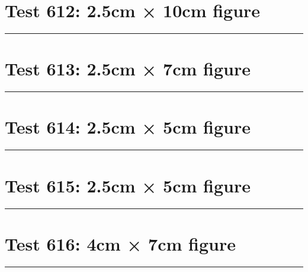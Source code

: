 \documentclass[a4paper,11pt]{article}
\begin{document}
\section*{Test 612: 2.5cm × 10cm figure}
\begin{swarmwrap}%
  \begin{minipage}[t]{2cm}
    \centering
    \rule{\linewidth}{10cm}
  \end{minipage}%
\end{swarmwrap}%
\swarmwrapnext
\lipsum[124]
\lipsum[125]
\lipsum[126]
\lipsum[127]
\section*{Test 613: 2.5cm × 7cm figure}
\begin{swarmwrap}%
  \begin{minipage}[t]{2cm}
    \centering
    \rule{\linewidth}{7cm}
  \end{minipage}%
\end{swarmwrap}%
\swarmwrapnext
\lipsum[5]
\lipsum[6]
\lipsum[7]
\lipsum[8]
\lipsum[9]
\section*{Test 614: 2.5cm × 5cm figure}
\begin{swarmwrap}%
  \begin{minipage}[t]{2cm}
    \centering
    \rule{\linewidth}{5cm}
  \end{minipage}%
\end{swarmwrap}%
\swarmwrapnext
\lipsum[124]
\lipsum[125]
\lipsum[126]
\section*{Test 615: 2.5cm × 5cm figure}
\begin{swarmwrap}%
  \begin{minipage}[t]{2cm}
    \centering
    \rule{\linewidth}{5cm}
  \end{minipage}%
\end{swarmwrap}%
\swarmwrapnext
\lipsum[63]
\lipsum[64]
\lipsum[65]
\lipsum[66]
\lipsum[67]
\lipsum[68]
\section*{Test 616: 4cm × 7cm figure}
\begin{swarmwrap}%
  \begin{minipage}[t]{4cm}
    \centering
    \rule{\linewidth}{7cm}
  \end{minipage}%
\end{swarmwrap}%
\swarmwrapnext
\lipsum[99]
\lipsum[100]
\lipsum[101]
\lipsum[102]
\lipsum[103]
\end{document}
